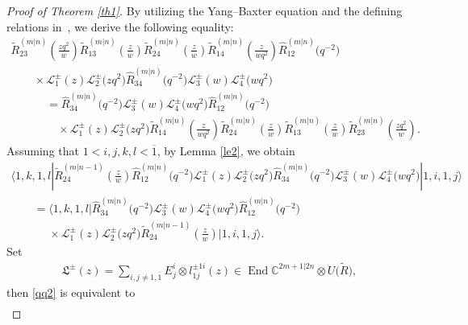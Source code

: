 \documentclass[10pt,a4paper]{amsart}
\numberwithin{equation}{section}
\begin{document}
\begin{proof}[Proof of Theorem \ref{th1}]
By utilizing the Yang--Baxter equation and the defining relations in~, we derive the following equality:
\begin{gather*}
 \widetilde{R}_{23}^{(m|n)}\left(\frac{zq^2}{w}\right)\widetilde{R}_{13}^{(m|n)}\left(\frac{z}{w}\right)\widetilde{R}_{24}^{(m|n)}
 \left(\frac{z}{w}\right)\widetilde{R}_{14}^{(m|n)}\left(\frac{z}{wq^2}\right)\widehat{R}_{12}^{(m|n)}\bigl(q^{-2}\bigr) \\
 \qquad\times \mathcal{L}^{\pm}_1(z)\mathcal{L}^{\pm}_2\bigl(zq^2\bigr)\widehat{R}_{34}^{(m|n)}\bigl(q^{-2}\bigr)\mathcal{L}^{\pm}_3(w)\mathcal{L}^{\pm}_4\bigl(wq^{2}\bigr) \\
\qquad\phantom{\times}{}= \widehat{R}_{34}^{(m|n)}\bigl(q^{-2}\bigr)\mathcal{L}^{\pm}_3(w)\mathcal{L}^{\pm}_4\bigl(wq^{2}\bigr)\widehat{R}_{12}^{(m|n)}\bigl(q^{-2}\bigr) \\
\qquad\phantom{\times=}{}\times \mathcal{L}^{\pm}_1(z)\mathcal{L}^{\pm}_2\bigl(zq^2\bigr)\widetilde{R}_{14}^{(m|n)}\left(\frac{z}{wq^2}\right)\widetilde{R}_{24}^{(m|n)}
 \left(\frac{z}{w}\right)
 \widetilde{R}_{13}^{(m|n)}\left(\frac{z}{w}\right)\widetilde{R}_{23}^{(m|n)}\left(\frac{zq^2}{w}\right).
\end{gather*}
Assuming that $1 < i, j, k, l < \overline{1}$, by Lemma \ref{le2}, we obtain
\begin{gather}
 \langle 1, k, 1, l |\widetilde{R}_{24}^{(m|n-1)}\left(\frac{z}{w}\right)\widehat{R}_{12}^{(m|n)}\bigl(q^{-2}\bigr)
 \mathcal{L}^{\pm}_1(z)\mathcal{L}^{\pm}_2\bigl(zq^2\bigr)\widehat{R}_{34}^{(m|n)}\bigl(q^{-2}\bigr)\mathcal{L}^{\pm}_3(w)\mathcal{L}^{\pm}_4\bigl(wq^{2}\bigr)| 1, i, 1, j\rangle \nonumber\\
\qquad = \langle 1, k, 1, l |\widehat{R}_{34}^{(m|n)}\bigl(q^{-2}\bigr)\mathcal{L}^{\pm}_3(w)\mathcal{L}^{\pm}_4\bigl(wq^{2}\bigr)\widehat{R}_{12}^{(m|n)}\bigl(q^{-2}\bigr)\nonumber\\
\phantom{\qquad =}{}\times
 \mathcal{L}^{\pm}_1(z)\mathcal{L}^{\pm}_2\bigl(zq^2\bigr)\widetilde{R}_{24}^{(m|n-1)}\left(\frac{z}{w}\right)| 1, i, 1, j\rangle.\label{qq2}
\end{gather}
Set
\begin{gather*}
 \mathfrak{L}^{\pm}(z)=\sum\limits_{i,j\neq1,\bar{1}}E^i_j\otimes l^{\pm1i}_{1j}(z)\in \operatorname{End}\mathbb{C}^{2m+1|2n}\otimes U\bigl(\widetilde{R}\bigr),
\end{gather*}
then \eqref{qq2} is equivalent to
\begin{gather}\label{22}

\end{gather}
\end{proof}
\end{document}
